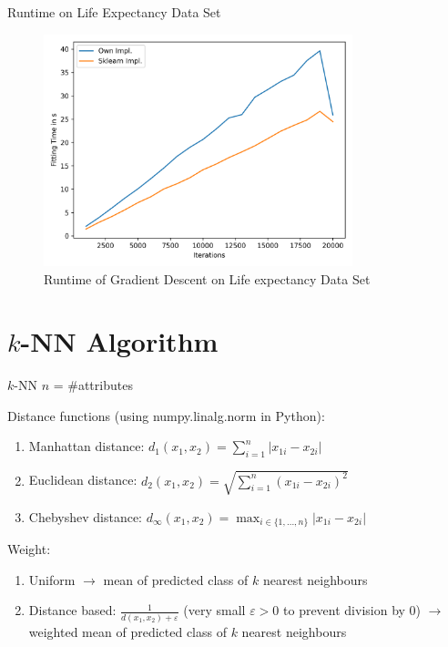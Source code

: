 \documentclass[10pt]{beamer}
\begin{document}
    \begin{frame}{Runtime on Life Expectancy Data Set}
          \begin{figure}[h!]
            \centering
            \includegraphics[width=0.8\textwidth]{exercise_2/presentation/figures/le_gradient-descent_scores_runtime.png}
            \caption{Runtime of Gradient Descent on Life expectancy Data Set}
            \label{fig:Grad_LE_runtime}
       \end{figure}
    \end{frame}
    
\section[$k$-NN]{$k$-NN Algorithm}
    \begin{frame}[fragile]{$k$-NN}
        $n$ = \#attributes
        
        Distance functions (using numpy.linalg.norm in Python):
            \begin{enumerate}
                \item Manhattan distance: $d_1(x_1, x_2) = \sum_{i=1}^n |x_{1i} - x_{2i}|$
                \item Euclidean distance: $d_2(x_1, x_2) = \sqrt{\sum_{i=1}^n (x_{1i} - x_{2i})^2}$
                \item Chebyshev distance: $d_\infty(x_1, x_2) = \max_{i \in \{1,...,n\}}|x_{1i} - x_{2i}|$
            \end{enumerate}
        
        Weight:
            \begin{enumerate}
                \item Uniform $\rightarrow$ mean of predicted class of $k$ nearest neighbours
                \item Distance based: $\frac{1}{d(x_1, x_2)+\varepsilon}$ (very small $\varepsilon>0$ to prevent division by $0$) $\rightarrow$ weighted mean of predicted class of $k$ nearest neighbours
            \end{enumerate}
    \end{frame}
    
\end{document}
